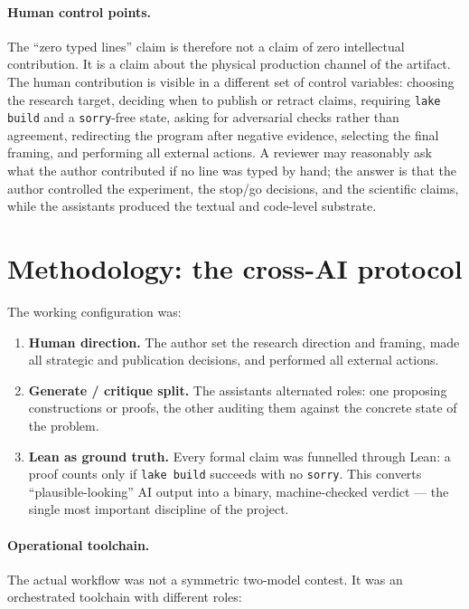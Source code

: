 \documentclass[11pt,a4paper]{article}
\theoremstyle{definition}
\begin{document}
\paragraph{Human control points.}
The ``zero typed lines'' claim is therefore not a claim of zero intellectual
contribution. It is a claim about the physical production channel of the
artifact. The human contribution is visible in a different set of control
variables: choosing the research target, deciding when to publish or retract
claims, requiring \texttt{lake build} and a \texttt{sorry}-free state, asking
for adversarial checks rather than agreement, redirecting the program after
negative evidence, selecting the final framing, and performing all external
actions. A reviewer may reasonably ask what the author contributed if no
line was typed by hand; the answer is that the author controlled the
experiment, the stop/go decisions, and the scientific claims, while the
assistants produced the textual and code-level substrate.

\section{Methodology: the cross-AI protocol}
\label{sec:method}

The working configuration was:
\begin{enumerate}[leftmargin=2em]
  \item \textbf{Human direction.} The author set the research direction and
        framing, made all strategic and publication decisions, and performed
        all external actions.
  \item \textbf{Generate / critique split.} The assistants alternated roles:
        one proposing constructions or proofs, the other auditing them
        against the concrete state of the problem.
  \item \textbf{Lean as ground truth.} Every formal claim was funnelled
        through Lean: a proof counts only if \texttt{lake build} succeeds
        with no \texttt{sorry}. This converts ``plausible-looking'' AI output
        into a binary, machine-checked verdict --- the single most important
        discipline of the project.
\end{enumerate}

\paragraph{Operational toolchain.}
The actual workflow was not a symmetric two-model contest. It was an
orchestrated toolchain with different roles:
\end{document}
